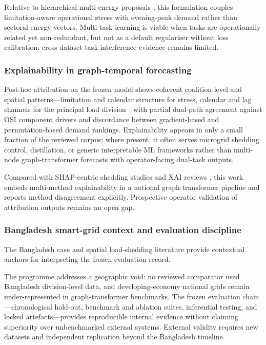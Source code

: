 Relative to hierarchical multi-energy proposals \cite{Song2024MultiTaskEnergy,Guillen2026LoadComposition}, this formulation couples limitation-aware operational stress with evening-peak demand rather than sectoral energy vectors. Multi-task learning is viable when tasks are operationally related yet non-redundant, but not as a default regulariser without loss calibration; cross-dataset task-interference evidence remains limited.

\subsubsection{Explainability in graph-temporal forecasting}\label{subsubsection:explainability_in_graph_temporal_forecasting}

Post-hoc attribution on the frozen model shows coherent coalition-level and spatial patterns---limitation and calendar structure for stress, calendar and lag channels for the principal load division---with partial dual-path agreement against OSI component drivers and discordance between gradient-based and permutation-based demand rankings. Explainability appears in only a small fraction of the reviewed corpus; where present, it often serves microgrid shedding control, distillation, or generic interpretable ML frameworks rather than multi-node graph-transformer forecasts with operator-facing dual-task outputs.

Compared with SHAP-centric shedding studies \cite{Wang2026SHAPLoadShedding,Lundberg2017SHAP} and XAI reviews \cite{Baur2024XAIReview}, this work embeds multi-method explainability in a national graph-transformer pipeline \cite{Cifci2025InterpretableSmartGrid} and reports method disagreement explicitly. Prospective operator validation of attribution outputs remains an open gap.

\subsubsection{Bangladesh smart-grid context and evaluation discipline}\label{subsubsection:bangladesh_smart_grid_context_and_evaluation_discipline}

The Bangladesh case \cite{Hossain2025BangladeshSmartGrid} and spatial load-shedding literature \cite{Paphitis2025SpatialLoadShedding} provide contextual anchors for interpreting the frozen evaluation record.

The programme addresses a geographic void: no reviewed comparator used Bangladesh division-level data, and developing-economy national grids remain under-represented in graph-transformer benchmarks. The frozen evaluation chain---chronological hold-out, benchmark and ablation suites, inferential testing, and locked artefacts---provides reproducible internal evidence without claiming superiority over unbenchmarked external systems. External validity requires new datasets and independent replication beyond the Bangladesh timeline.

